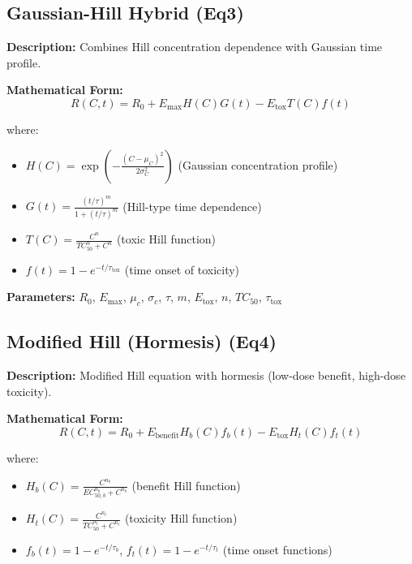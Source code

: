 \documentclass[11pt,a4paper]{article}
\begin{document}
\subsection{Gaussian-Hill Hybrid (Eq3)}

\textbf{Description:} Combines Hill concentration dependence with Gaussian time profile.

\textbf{Mathematical Form:}
\begin{equation}
R(C,t) = R_0 + E_{\mathrm{max}} H(C) G(t) - E_{\mathrm{tox}} T(C) f(t)
\end{equation}

where:
\begin{itemize}
\item $H(C) = \exp\left(-\frac{(C-\mu_C)^2}{2\sigma_C^2}\right)$ (Gaussian concentration profile)
\item $G(t) = \frac{(t/\tau)^m}{1+(t/\tau)^m}$ (Hill-type time dependence)
\item $T(C) = \frac{C^n}{TC_{50}^n + C^n}$ (toxic Hill function)
\item $f(t) = 1 - e^{-t/\tau_{\mathrm{tox}}}$ (time onset of toxicity)
\end{itemize}

\textbf{Parameters:} $R_0$, $E_{\mathrm{max}}$, $\mu_c$, $\sigma_c$, $\tau$, $m$, $E_{\mathrm{tox}}$, $n$, $TC_{50}$, $\tau_{\mathrm{tox}}$


\subsection{Modified Hill (Hormesis) (Eq4)}

\textbf{Description:} Modified Hill equation with hormesis (low-dose benefit, high-dose toxicity).

\textbf{Mathematical Form:}
\begin{equation}
R(C,t) = R_0 + E_{\mathrm{benefit}} H_b(C) f_b(t) - E_{\mathrm{tox}} H_t(C) f_t(t)
\end{equation}

where:
\begin{itemize}
\item $H_b(C) = \frac{C^{n_b}}{EC_{50,b}^{n_b} + C^{n_b}}$ (benefit Hill function)
\item $H_t(C) = \frac{C^{n_t}}{TC_{50}^{n_t} + C^{n_t}}$ (toxicity Hill function)
\item $f_b(t) = 1 - e^{-t/\tau_b}$, $f_t(t) = 1 - e^{-t/\tau_t}$ (time onset functions)
\end{itemize}
\end{document}
